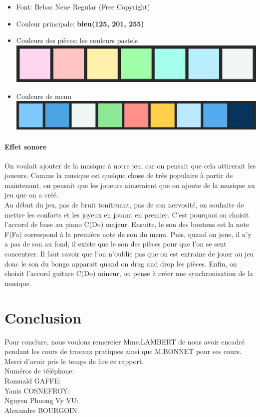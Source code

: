 \documentclass[a4paper]{report}
\begin{document}
\begin{itemize} 
    \item Font: Bebas Neue Regular (Free Copyright)
    \item Couleur principale: \textbf{bleu(125, 201, 255)}
    \item Couleurs des pièces: les couleurs pastels\\
        \includegraphics[scale=0.3]{images/palette1.png}
    \item Couleurs de menu\\
        \includegraphics[scale=0.3]{images/palette2.png}
\end{itemize}

\subsection{Effet sonore}
On voulait ajouter de la musique à notre jeu, car on pensait que cela attirerait les joueurs. 
Comme la musique est quelque chose de très populaire à partir de maintenant, on pensait que les 
joueurs aimeraient que on ajoute de la musique au jeu que on a créé.\\

Au début du jeu, pas de bruit tonitruant, pas de son nervosité, on souhaite de mettre les conforts et les joyeux en jouant en premier. C'est pourquoi on choisit l'accord de base au piano C(Do) majeur.
Ensuite, le son des boutons est la note F(Fa) correspond à la première note de son du menu.
Puis, quand on joue, il n'y a pas de son au fond, il existe que le son des pièces pour que l'on se sent concentrer. Il faut savoir que l'on n'oublie pas que on est entraine de jouer au jeu donc le son du bongo apparait quand on drag and drop les pièces.
Enfin, on choisit l'accord guitare C(Do) mineur, on pense à créer une synchronisation de la musique.


\part{Conclusion}
Pour conclure, nous voulons remercier Mme.LAMBERT de nous avoir encadré pendant les cours de travaux pratiques ainsi que M.BONNET pour ses cours. Merci d'avoir pris le temps de lire ce rapport. \\

Numéros de téléphone: \\
Romuald GAFFE: \\
Yanis COSNEFROY:\\
Nguyen Phuong Vy VU:\\
Alexandre BOURGOIN: \
\end{document}

